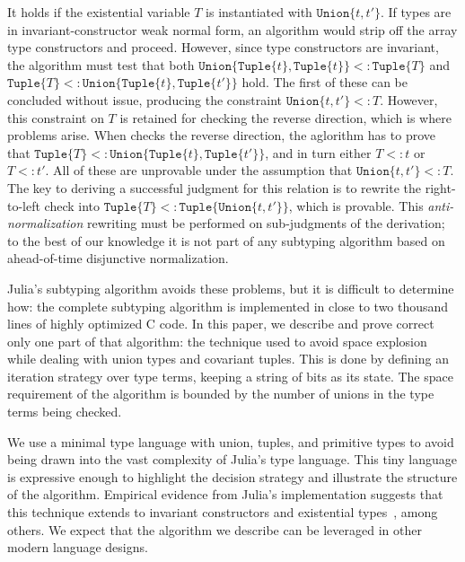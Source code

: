 \documentclass[a4paper,english]{lipics-v2019}
\newcommand{\xt}[1]{\texttt{#1}}
\newcommand{\union}[2]{\xt{Union\{}#1,#2\xt{\}}}
\newcommand{\tuple}[1]{\xt{Tuple\{}#1\xt{\}}}
\newcommand{\arrayt}[1]{\xt{Array\{}#1\xt{\}}}
\begin{document}
%
\vspace{-4mm}{\small\[
  \arrayt{\union{\tuple{t}}{\tuple{t'}}} \ \ <:\ \ \exists T\,.\, \arrayt{\tuple{T}}
\]}\vspace{-4mm}
%

\noindent  It holds if the existential variable {\small$T$} is instantiated with
{\small $\union{t}{t'}$}.
If types are in invariant-constructor weak normal form, an algorithm 
would strip off the array type constructors
and proceed.  However, since type constructors are invariant, 
the algorithm must test that both
{\small$\union{\tuple{t}}{\tuple{t}}<:\tuple{T}$} and 
{\small$\tuple{T}<:\union{\tuple{t}}{\tuple{t'}}$} hold.
The first of these can be concluded without
issue, producing the constraint {\small$\union{t}{t'} <: T$}. However, this
constraint on $T$ is retained for checking the reverse direction,
which is where problems arise. When checks the reverse direction,
the aglorithm has to prove that
{\small$\tuple{T}<:\union{\tuple{t}}{\tuple{t'}}$}, and in turn either
{\small$T<:t$} or {\small$T<:t'$}. All of these are unprovable under the
assumption that {\small$\union{t}{t'} <: T$}.
The key to deriving a successful judgment for this relation is to rewrite the
right-to-left check into {\small$\tuple{T}<:\tuple{\union{t}{t'}}$}, which is
provable. This \emph{anti-normalization} rewriting must be performed on
sub-judgments of the derivation; to the best of our knowledge it is not
part of any subtyping algorithm based on ahead-of-time disjunctive
normalization. 

Julia's subtyping algorithm avoids these problems, but it is difficult to
determine how: the complete subtyping algorithm is implemented in close to
two thousand lines of highly optimized C code. In this paper, we describe and
prove correct only one part of that algorithm: the technique used to avoid
space explosion while dealing with union types and covariant tuples. This is
done by defining an iteration strategy over type terms, keeping a string of
bits as its state. The space requirement of the algorithm is bounded by the
number of unions in the type terms being checked.

We use a minimal type language with union, tuples, and primitive types to
avoid being drawn into the vast complexity of Julia's type language. This tiny
language is expressive enough to highlight the decision strategy and
illustrate the structure of the algorithm. Empirical evidence from Julia's
implementation suggests that this technique extends to invariant constructors
and existential types~\cite{DBLP:NardelliBPCBV18}, among others. We expect
that the algorithm we describe can be leveraged in other modern language
designs.
\end{document}
